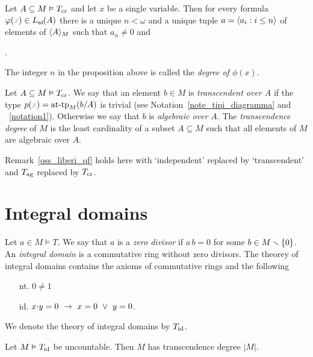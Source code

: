 \documentclass[creche.tex]{subfiles}
\begin{document}
\begin{proposition}
\label{prop_formacanonicaterminiau}
Let  $A\subseteq M\models T_{\rm cr}$ and let $x$ be a single variable. Then for every formula $\phi({\mr x})\in \atL(A)$ there is a unique $n<\omega$ and a unique tuple $a=\<a_i:i\le n\>$ of elements of $\<A\>_M$ such that $a_n\neq0$ and 

.\QED
\end{proposition}

The integer $n$ in the proposition above is called the \emph{degree of $\phi(x)$}.

\begin{definition} Let $A\subseteq M\models T_{\rm cr}$. We say that an element $b\in M$ is \emph{transcendent over $A$\/} if the type $p({\mr x})=\attp_M(b/A)$ is trivial (see Notation~\ref{note_tipi_diagramma} and ~\ref{notation1}). Otherwise we say that $b$ is \emph{algebraic over $A$}. The \emph{transcendence degree\/} of $M$ is the least cardinality of a subset $A\subseteq M$ such that all elements of $M$ are algebraic over $A$.\QED
\end{definition}  

\begin{remark}\label{oss_liberi_cr}
Remark~\ref{oss_liberi_qf} holds here with `independent' replaced by `transcendent' and $T_{\rm ag}$ replaced by $T_{\rm cr}$.\QED
\end{remark}

\section{Integral domains}

Let $a\in M\models T$. We say that $a$ is a \emph{zero divisor} if $a\,b=0$ for some $b\in M\sm\{0\}$. An \emph{integral domain\/} is a commutative ring without zero divisors. The theorey of integral domains contains the axioms of commutative rings and the following
\begin{itemize}
\item[nt.] $0\neq 1$
\item[id.] $x\mdot y =0\ \imp\ x=0\ \vee\ y=0$.
\end{itemize}

We denote the theory  of integral domains by \emph{$T_{\rm id}$}.


\begin{proposition}
Let $M\models T_{\rm id}$ be uncountable. Then $M$ has transcendence degree $|M|$.
\end{proposition}
\end{document}

